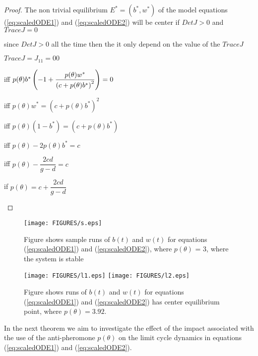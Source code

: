 \documentclass[review,authoryear]{elsarticle}
\begin{document}
\begin{proof}
  The non trivial equilibrium $E^{\ast }=(b^{\ast },w^{\ast })$ of the
  model equations (\ref{eq:scaledODE1}) and (\ref{eq:scaledODE2}) will
  be center if $DetJ>0$ and $TraceJ=0$

since $DetJ>0$ all the time then the it only depend on the value of the $%
TraceJ$
\begin{center}
$TraceJ=J_{11}=00$

iff $p(\theta )b^{\ast }\left( -1+\dfrac{p(\theta )w^{\ast }}{%
\left( c+p(\theta )b^{\ast }\right) ^{2}}\right) =0$

iff $p(\theta )w^{\ast }=\left( c+p(\theta )b^{\ast }\right)
^{2} $

iff $p(\theta )\left( 1-b^{\ast }\right) =\left( c+p(\theta
)b^{\ast }\right) $

iff $p(\theta )-2p(\theta )b^{\ast }=c$

iff $p(\theta )-\dfrac{2cd}{g-d}=c$

if $p(\theta )=c+\dfrac{2cd}{g-d}$
\end{center}

\end{proof}
\begin{figure}[!htp]
\begin{center}
\texttt{[image: FIGURES/s.eps]}  

\end{center}

\caption{Figure shows sample runs of $b(t)$ and $w(t)$ for equations
  (\ref{eq:scaledODE1}) and (\ref{eq:scaledODE2}), where
  $p(\theta )$ = 3, where the system is stable }
      \label{fig:S}
\end{figure}
\begin{figure}[!htp]
\begin{center}
\texttt{[image: FIGURES/l1.eps]}  
\texttt{[image: FIGURES/l2.eps]}

\end{center}

\caption{Figure shows runs of $b(t)$ and $w(t)$ for equations
  (\ref{eq:scaledODE1}) and (\ref{eq:scaledODE2}) has center
  equilibrium point, where $p(\theta )=3.92$. }
      \label{fig:l1l2}
\end{figure}

In the next theorem we aim to investigate the effect of the impact
associated with the use of the anti-pheromone $p(\theta )$ on
the limit cycle dynamics in equations (\ref{eq:scaledODE1}) and
(\ref{eq:scaledODE2}).
\end{document}

